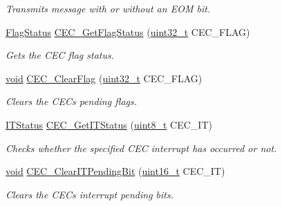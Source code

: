 \begin{DoxyCompactItemize}
\begin{DoxyCompactList}\small\item\em Transmits message with or without an E\+OM bit. \end{DoxyCompactList}\item 
\hyperlink{agilefox_2library_2inc_2stm32f10x__type_8h_a89136caac2e14c55151f527ac02daaff}{Flag\+Status} \hyperlink{group___c_e_c___private___functions_gaf920706cb350182bf0728c66868053ca}{C\+E\+C\+\_\+\+Get\+Flag\+Status} (\hyperlink{_p_e___types_8h_a33594304e786b158f3fb30289278f5af}{uint32\+\_\+t} C\+E\+C\+\_\+\+F\+L\+AG)
\begin{DoxyCompactList}\small\item\em Gets the C\+EC flag status. \end{DoxyCompactList}\item 
\hyperlink{usb__devapi_8h_afabf60e7f57651d6d595a02c75f07cd0}{void} \hyperlink{group___c_e_c___private___functions_ga928b373fb5972204c56f9c64113f8c67}{C\+E\+C\+\_\+\+Clear\+Flag} (\hyperlink{_p_e___types_8h_a33594304e786b158f3fb30289278f5af}{uint32\+\_\+t} C\+E\+C\+\_\+\+F\+L\+AG)
\begin{DoxyCompactList}\small\item\em Clears the C\+EC\textquotesingle{}s pending flags. \end{DoxyCompactList}\item 
\hyperlink{agilefox_2library_2inc_2stm32f10x__type_8h_aacbd7ed539db0aacd973a0f6eca34074}{I\+T\+Status} \hyperlink{group___c_e_c___private___functions_gaa1940a388d0bfcefe7483fb74cc2ba1d}{C\+E\+C\+\_\+\+Get\+I\+T\+Status} (\hyperlink{_p_e___types_8h_aba7bc1797add20fe3efdf37ced1182c5}{uint8\+\_\+t} C\+E\+C\+\_\+\+IT)
\begin{DoxyCompactList}\small\item\em Checks whether the specified C\+EC interrupt has occurred or not. \end{DoxyCompactList}\item 
\hyperlink{usb__devapi_8h_afabf60e7f57651d6d595a02c75f07cd0}{void} \hyperlink{group___c_e_c___private___functions_gade646921262a077172c708953822f248}{C\+E\+C\+\_\+\+Clear\+I\+T\+Pending\+Bit} (\hyperlink{_p_e___types_8h_a1f1825b69244eb3ad2c7165ddc99c956}{uint16\+\_\+t} C\+E\+C\+\_\+\+IT)
\begin{DoxyCompactList}\small\item\em Clears the C\+EC\textquotesingle{}s interrupt pending bits. \end{DoxyCompactList}\end{DoxyCompactItemize}
